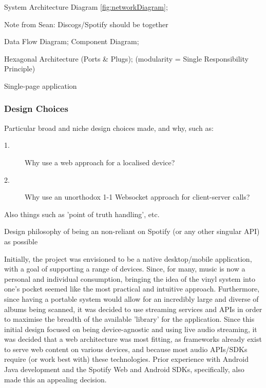             \begin{temp}
                System Architecture Diagram \ref{fig:networkDiagram};
                \begin{temp}Note from Sean: Discogs/Spotify should be together\end{temp}
                
                Data Flow Diagram; Component Diagram;
    
                Hexagonal Architecture (Ports \& Plugs); (modularity = Single Responsibility Principle)
    
                Single-page application
            \end{temp}
        
            \subsubsection{Design Choices}
                \begin{temp}
                    Particular broad and niche design choices made, and why, such as:
                    \begin{description}
                        \item[1.] Why use a web approach for a localised device?
                        \item[2.] Why use an unorthodox 1-1 Websocket approach for client-server calls?
                    \end{description}
                    Also things such as 'point of truth handling', etc.
                    
                    Design philosophy of being an non-reliant on Spotify (or any other singular API) as possible
                \end{temp}
    
                Initially, the project was envisioned to be a native desktop/mobile application, with a goal of supporting a range of devices. Since, for many, music is now a personal and individual consumption, bringing the idea of the vinyl system into one's pocket seemed like the most practical and intuitive approach. Furthermore, since having a portable system would allow for an incredibly large and diverse of albums being scanned, it was decided to use streaming services and APIs in order to maximise the breadth of the available 'library' for the application. Since this initial design focused on being device-agnostic and using live audio streaming, it was decided that a web architecture was most fitting, as frameworks already exist to serve web content on various devices, and because most audio APIs/SDKs require (or work best with) these technologies. Prior experience with Android Java development and the Spotify Web and Android SDKs, specifically, also made this an appealing decision.
    
